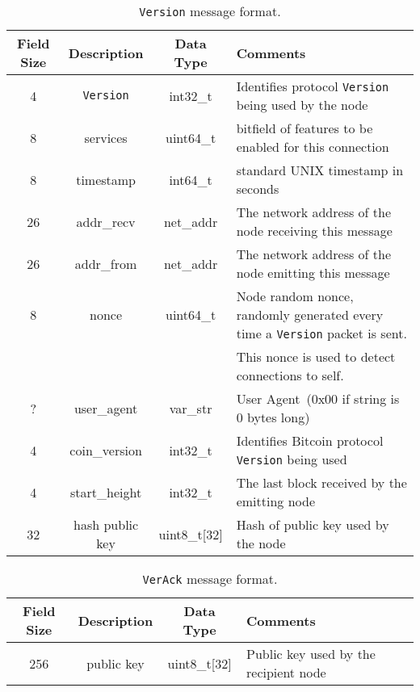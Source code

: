 \begin{table*}[ht!]
\begin{center}
\caption{{\tt Version} message format.}
\label{tab:msg-version}
    \begin{tabular}{|c|c|c|l|} \hline
    \textbf{Field Size} & {\bf Description} & {\bf Data Type} & {\bf Comments} \\ \hline
    4 & {\tt Version} & int32\_t & Identifies protocol {\tt Version} being used by the node \\
    8 & services & uint64\_t & bitfield of features to be enabled for this connection \\
    8 & timestamp & int64\_t & standard UNIX timestamp in seconds \\
    26 & addr\_recv & net\_addr & The network address of the node receiving this message \\
    26 & addr\_from & net\_addr & The network address of the node emitting this message \\
    8 & nonce & uint64\_t & Node random nonce, randomly generated every time a {\tt Version} packet is sent. \\
    ~ & ~ & ~ & This nonce is used to detect connections to self.
 \\
    ? & user\_agent & var\_str & User Agent (0x00 if string is 0 bytes long) \\
    4 & coin\_version & int32\_t & Identifies Bitcoin protocol {\tt Version} being used \\
    4 & start\_height & int32\_t & The last block received by the emitting node \\
    32 & hash public key & uint8\_t[32] & Hash of public key used by the node \\ \hline
    \end{tabular}
\end{center}
\end{table*}

\begin{table*}[ht!]
\begin{center}
\caption{{\tt VerAck} message format.}
\label{tab:msg-verack}
    \begin{tabular}{|c|c|c|l|} \hline
    \textbf{Field Size} & {\bf Description} & {\bf Data Type} & {\bf Comments} \\ \hline
    256 & public key & uint8\_t[32] & Public key used by the recipient node \\ \hline
    \end{tabular}
\end{center}
\end{table*}

